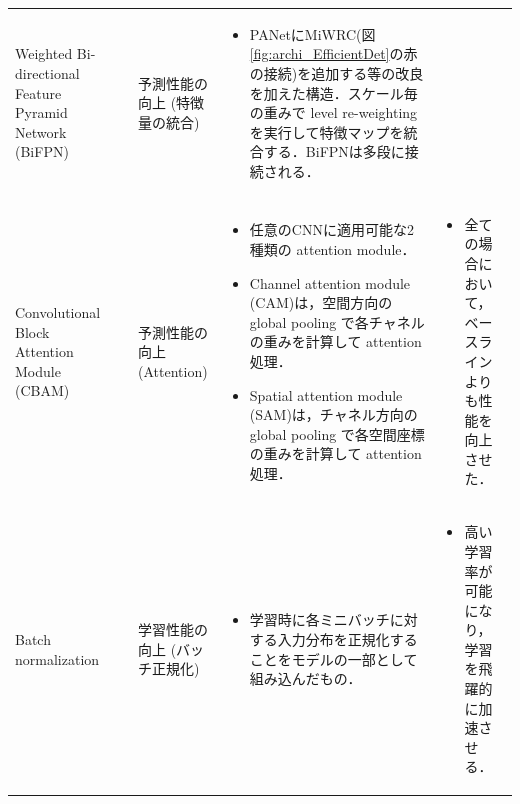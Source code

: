 \documentclass[twocolumn]{jsarticle} %
\begin{document}
\begin{table}
\begin{center}
\begin{tabularx}{\linewidth}{Xp{1.5cm}Xp{7cm}X}
            Weighted Bi-directional Feature Pyramid Network (BiFPN)
            \vspace{0.7\baselineskip}
            & \cite{TPL20} & 予測性能の向上 (特徴量の統合) & 
            \begin{itemize}
                \vspace{-0.7\baselineskip}
                \setlength{\leftskip}{-3mm}
                \item PANetにMiWRC(図\ref{fig:archi_EfficientDet}の赤の接続)を追加する等の改良を加えた構造．スケール毎の重みで level re-weighting を実行して特徴マップを統合する．BiFPNは多段に接続される．
            \end{itemize}
            &
            \\

            Convolutional Block Attention Module (CBAM) 
            & \cite{WPLK18} & 予測性能の向上 (Attention) & 
            \begin{itemize}
                \vspace{-0.7\baselineskip}
                \setlength{\leftskip}{-3mm}
                \item 任意のCNNに適用可能な2種類の attention module．
                \item Channel attention module (CAM)は，空間方向の global pooling で各チャネルの重みを計算して attention 処理．
                \item Spatial attention module (SAM)は，チャネル方向の global pooling で各空間座標の重みを計算して attention 処理． 
            \end{itemize}
            &
            \begin{itemize}
                \vspace{-0.7\baselineskip}
                \setlength{\leftskip}{-3mm}
                \item 全ての場合において，ベースラインよりも性能を向上させた．
            \end{itemize}
            \\

            Batch normalization
            & \cite{IoffeSzege15} & 学習性能の向上 (バッチ正規化) & 
            \begin{itemize}
                \vspace{-0.7\baselineskip}
                \setlength{\leftskip}{-3mm}
                \item 学習時に各ミニバッチに対する入力分布を正規化することをモデルの一部として組み込んだもの．
            \end{itemize}
            &
            \begin{itemize}
                \vspace{-0.7\baselineskip}
                \setlength{\leftskip}{-3mm}
                \item 高い学習率が可能になり，学習を飛躍的に加速させる．
            \end{itemize}
            \\


\end{tabularx}
\end{center}
\end{table}
\end{document}

